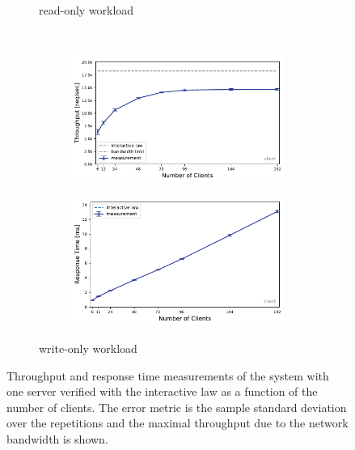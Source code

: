 \documentclass[report.tex]{subfiles}
\begin{document}
\begin{figure}[H]
\begin{subfigure}{\linewidth}
	\caption{read-only workload}
	\label{exp21_ro_nc}
\end{subfigure}
\\[1ex]
\begin{subfigure}{\linewidth}
	\begin{subfigure}[b]{.49\linewidth}
		\centering
		\includegraphics[width=\linewidth]{data/exp21_wo_tp_nc.pdf}
	\end{subfigure}\hfill
	\begin{subfigure}[b]{.49\linewidth}
		\centering
		\includegraphics[width=\linewidth]{data/exp21_wo_rt_nc.pdf}
	\end{subfigure}%
	\caption{write-only workload}
	\label{exp21_wo_nc}
\end{subfigure}
\caption{Throughput and response time measurements of the system with one server verified with the interactive law as a function of the number of clients. The error metric is the sample standard deviation over the repetitions and the maximal throughput due to the network bandwidth is shown.}
\end{figure}
\end{document}
